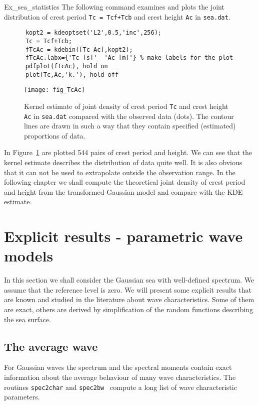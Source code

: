 \begin{cex}{Ex_sea_statistics} The following command examines and
  plots the joint distribution of crest period {\tt Tc = Tcf+Tcb}
  and crest height {\tt Ac} in \verb+sea.dat+.
{\small\begin{verbatim}
      kopt2 = kdeoptset('L2',0.5,'inc',256);
      Tc = Tcf+Tcb;
      fTcAc = kdebin([Tc Ac],kopt2);
      fTcAc.labx={'Tc [s]'  'Ac [m]'} % make labels for the plot
      pdfplot(fTcAc), hold on
      plot(Tc,Ac,'k.'), hold off
\end{verbatim}}

\begin{figure}
\centering
   \texttt{[image: fig\_TcAc]}
\vspace{-3mm}
  \caption[Kernel estimate of the joint density of crest period and
crest height]{
Kernel estimate of joint density of crest period {\tt Tc} and
crest height {\tt Ac} in {\tt sea.dat} compared with the observed data
(dots). The contour lines are drawn in such a way that they contain
specified (estimated) proportions of data.
}
  \label{fig_TcAc}
\end{figure}

In Figure~\ref{fig_TcAc} are plotted 544 pairs of crest period and
height. We can see that the kernel estimate describes the
distribution of data quite well. It is also obvious that it can not be
used to extrapolate outside the observation range. In the following
chapter we shall compute the theoretical joint density of crest period
and height from the transformed Gaussian model and compare with the
KDE estimate.
\end{cex}

\section{Explicit results - parametric wave models}
\label{sec:explicitresults_wavemodels}

In this section we shall consider the Gaussian sea with well-defined spectrum. We assume that the
reference level is zero. We will
present some explicit results that are known and
studied in the literature about wave characteristics. Some of them are
exact, others are derived by simplification of the random functions
describing the sea surface.

\subsection{The average wave}
For Gaussian waves the spectrum and the spectral moments contain exact
information about the average behaviour of many wave
characteristics. The \progname{} routines
\verb+spec2char+ and
\verb+spec2bw +
compute a long list of wave characteristic parameters.


